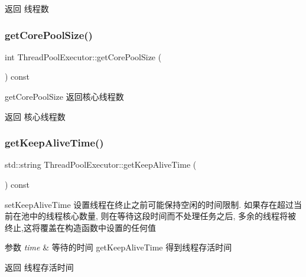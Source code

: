 \begin{DoxyReturn}{返回}
线程数 
\end{DoxyReturn}
\mbox{\label{classThreadPoolExecutor_a9099318ba5cab5dd05f219babba4b6b7}} 
\subsubsection{\texorpdfstring{get\+Core\+Pool\+Size()}{getCorePoolSize()}}
{\footnotesize\ttfamily int Thread\+Pool\+Executor\+::get\+Core\+Pool\+Size (\begin{DoxyParamCaption}{ }\end{DoxyParamCaption}) const}



get\+Core\+Pool\+Size 返回核心线程数 

\begin{DoxyReturn}{返回}
核心线程数 
\end{DoxyReturn}
\mbox{\label{classThreadPoolExecutor_aeb35f2475788af6b98d1ca1bf8d05536}} 
\subsubsection{\texorpdfstring{get\+Keep\+Alive\+Time()}{getKeepAliveTime()}}
{\footnotesize\ttfamily std\+::string Thread\+Pool\+Executor\+::get\+Keep\+Alive\+Time (\begin{DoxyParamCaption}{ }\end{DoxyParamCaption}) const}



set\+Keep\+Alive\+Time 设置线程在终止之前可能保持空闲的时间限制. 如果存在超过当前在池中的线程核心数量, 则在等待这段时间而不处理任务之后, 多余的线程将被终止,这将覆盖在构造函数中设置的任何值 


\begin{DoxyParams}{参数}
{\em time} & 等待的时间 get\+Keep\+Alive\+Time 得到线程存活时间\\
\hline
\end{DoxyParams}
\begin{DoxyReturn}{返回}
线程存活时间 
\end{DoxyReturn}
\mbox{\label{classThreadPoolExecutor_af67082427f76bd9b14b2dabf43f96300}} 
